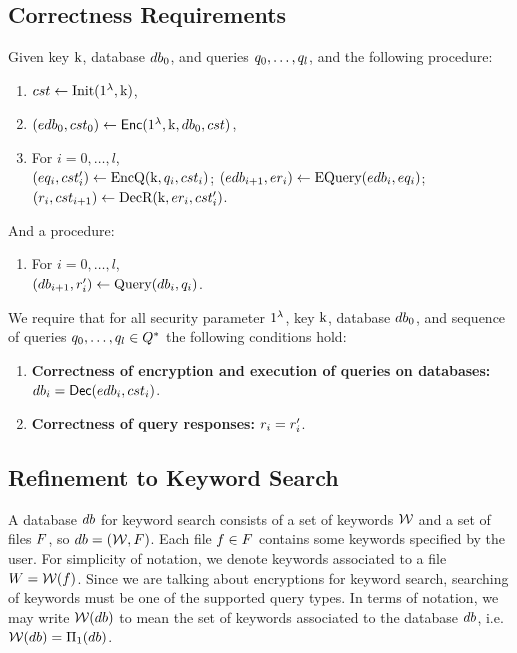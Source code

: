 \subsection{Correctness Requirements}
Given key $\text{k}$, database $db_0$, and queries $q_0, \dots, q_l$, and the following procedure:
\begin{enumerate}
	\item $cst \gets \text{Init}(1^{\lambda}, \text{k})$,
	
	\item $(edb_0, cst_0) \gets \mathsf{Enc}(1^{\lambda}, \text{k}, db_0, cst)$,
	
	
	\item For $i = 0, \dots, l$, \\
		  $(eq_i, cst_i') \gets \text{EncQ}(\text{k}, q_i, cst_i)$; $(edb_{i+1}, er_i) \gets \text{EQuery}(edb_i, eq_i)$; $(r_i, cst_{i+1}) \gets \text{DecR}(\text{k}, er_i, cst_i')$.
\end{enumerate}
And a procedure:
\begin{enumerate}
	\item For $i = 0, \dots, l$, \\
		  $(db_{i+1}, r_i') \gets \text{Query}(db_i, q_i)$.
\end{enumerate}

We require that for all security parameter $1^{\lambda}$, key $\text{k}$, database $db_0$, and sequence of queries $q_0, \dots, q_l \in Q^{*}$ the following conditions hold:
\begin{enumerate}
	\item \textbf{Correctness of encryption and execution of queries on databases:} $db_i = \mathsf{Dec}(edb_i, cst_i)$.
	
	\item \textbf{Correctness of query responses:} $r_i = r_i'$.
\end{enumerate}


\subsection{Refinement to Keyword Search}
A database $db$ for keyword search consists of a set of keywords $\mathcal{W}$ and a set of files $F$, so $db = (\mathcal{W}, F)$. Each file $f \in F$ contains some keywords specified by the user. For simplicity of notation, we denote keywords associated to a file $W = \mathcal{W}(f)$. Since we are talking about encryptions for keyword search, searching of keywords must be one of the supported query types. In terms of notation, we may write $\mathcal{W}(db)$ to mean the set of keywords associated to the database $db$, i.e. $\mathcal{W}(db) = \Pi_1(db)$.

